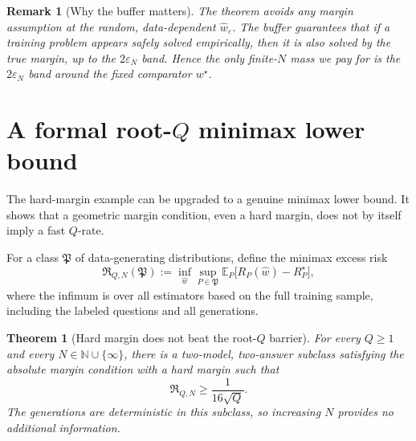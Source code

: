 \documentclass[11pt]{article}
\newtheorem{theorem}{Theorem}
\newtheorem{remark}{Remark}
\newcommand{\E}{\mathbb E}
\newcommand{\what}{\widehat w}
\newcommand{\wstar}{w^\star}
\newcommand{\eps}{\varepsilon}
\begin{document}
\begin{remark}[Why the buffer matters]
The theorem avoids any margin assumption at the random, data-dependent $\what_\eps$.  The buffer guarantees that if a training problem appears safely solved empirically, then it is also solved by the true margin, up to the $2\eps_N$ band.  Hence the only finite-$N$ mass we pay for is the $2\eps_N$ band around the fixed comparator $\wstar$.
\end{remark}


\section{A formal root-$Q$ minimax lower bound}
\label{sec:q-lower}

The hard-margin example can be upgraded to a genuine minimax lower bound.  It shows that a geometric margin condition, even a hard margin, does not by itself imply a fast $Q$-rate.

For a class $\mathfrak P$ of data-generating distributions, define the minimax excess risk
\[
\mathfrak R_{Q,N}(\mathfrak P)
:=
\inf_{\widehat w}
\sup_{P\in\mathfrak P}
\E_P\big[R_P(\widehat w)-R_P^\star\big],
\]
where the infimum is over all estimators based on the full training sample, including the labeled questions and all generations.

\begin{theorem}[Hard margin does not beat the root-$Q$ barrier]
\label{thm:q-lower}
For every $Q\ge1$ and every $N\in\mathbb N\cup\{\infty\}$, there is a two-model, two-answer subclass satisfying the absolute margin condition with a hard margin such that
\[
\mathfrak R_{Q,N}\ge \frac{1}{16\sqrt Q}.
\]
The generations are deterministic in this subclass, so increasing $N$ provides no additional information.
\end{theorem}
\end{document}
